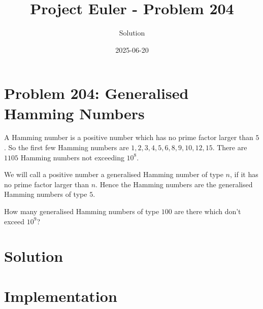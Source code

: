 \documentclass{article}
\title{Project Euler - Problem 204}
\author{Solution}
\date{2025-06-20}
\begin{document}
\maketitle

\section*{Problem 204: Generalised Hamming Numbers}


A Hamming number is a positive number which has no prime factor larger than $5$.
So the first few Hamming numbers are $1, 2, 3, 4, 5, 6, 8, 9, 10, 12, 15$.
There are $1105$ Hamming numbers not exceeding $10^8$.

\par
We will call a positive number a generalised Hamming number of type $n$, if it has no prime factor larger than $n$.
Hence the Hamming numbers are the generalised Hamming numbers of type $5$.

\par
How many generalised Hamming numbers of type $100$ are there which don't exceed $10^9$?

\par


\section*{Solution}



\section*{Implementation}

\end{document}
